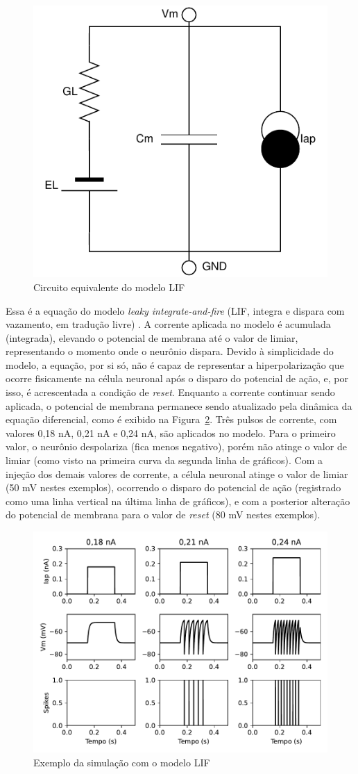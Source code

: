 \begin{figure}[htb!]
	\centering
	\caption{Circuito equivalente do modelo LIF}
	\label{fig:circuitolif}
	\includegraphics[width=0.5\linewidth]{figs/circuito_lif}
\end{figure}
Essa é a equação do modelo \textit{leaky integrate-and-fire} (LIF, integra e dispara com vazamento, em tradução livre) \cite{lapicque_recherches_1907}. A corrente aplicada no modelo é acumulada (integrada), elevando o potencial de membrana até o valor de limiar, representando o momento onde o neurônio dispara. Devido à simplicidade do modelo, a equação, por si só, não é capaz de representar a hiperpolarização que ocorre fisicamente na célula neuronal após o disparo do potencial de ação, e, por isso, é acrescentada a condição de \textit{reset}. Enquanto a corrente continuar sendo aplicada, o potencial de membrana permanece sendo atualizado pela dinâmica da equação diferencial, como é exibido na Figura~\ref{fig:lif}. Três pulsos de corrente, com valores 0,18 nA, 0,21 nA e 0,24 nA, são aplicados no modelo. Para o primeiro valor, o neurônio despolariza (fica menos negativo), porém não atinge o valor de limiar (como visto na primeira curva da segunda linha de gráficos). Com a injeção dos demais valores de corrente, a célula neuronal atinge o valor de limiar (50 mV nestes exemplos), ocorrendo o disparo do potencial de ação (registrado como uma linha vertical na última linha de gráficos), e com a posterior alteração do potencial de membrana para o valor de \textit{reset} (80 mV nestes exemplos).

\begin{figure}[htb!]
	\centering
	\caption[Exemplo da simulação com o modelo LIF]{Exemplo da simulação com o modelo LIF}
	\label{fig:lif}
	\includegraphics[width=0.7\linewidth]{figs/lif}
\end{figure}

